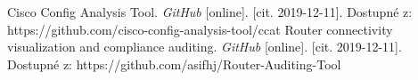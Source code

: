 \begin{literatura}{99}
Cisco Config Analysis Tool. \textit{GitHub} [online]. [cit. 2019-12-11]. Dostupné z: https://github.com/cisco-config-analysis-tool/ccat
Router connectivity visualization and compliance auditing. \textit{GitHub} [online]. [cit. 2019-12-11]. Dostupné z: https://github.com/asifhj/Router-Auditing-Tool




\end{literatura}


%
%
%
